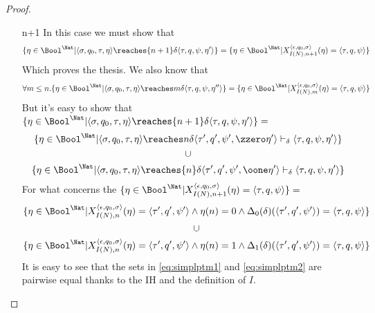 \begin{proof}
\begin{itemize}
\item[n+1] In this case we must show that
\[
\{\eta \in \Bool^\Nat| \langle \sigma, q_0, \tau, \eta\rangle  \reaches {n+1}\delta \langle \tau, q, \psi, \eta'\rangle \} = \{\eta \in \Bool^\Nat| X_{I(N), n+1}^{\langle \epsilon, q_0, \sigma\rangle} (\eta)= {\langle \tau, q, \psi\rangle}\}
\]
Which proves the thesis. We also know that
\[
\forall m\le n.\{\eta \in \Bool^\Nat| \langle \sigma, q_0, \tau, \eta\rangle  \reaches m \delta \langle \tau, q, \psi, \eta''\rangle \} = \{\eta \in \Bool^\Nat| X_{I(N), m}^{\langle \epsilon, q_0, \sigma\rangle} (\eta)= {\langle \tau, q, \psi\rangle}\}
\]
But it's easy to show that $\{\eta \in \Bool^\Nat| \langle \sigma, q_0, \tau, \eta\rangle  \reaches {n+1}\delta \langle \tau, q, \psi, \eta'\rangle \} =$
\begin{equation}
\label{eq:simplptm1}
\begin{gathered}
\{\eta \in \Bool^\Nat| \langle \sigma, q_0, \tau, \eta\rangle  \reaches n\delta \langle \tau', q', \psi', \zzero\eta'\rangle \vdash_\delta  \langle \tau, q, \psi, \eta'\rangle\}\\
\cup\\
\{\eta \in \Bool^\Nat| \langle \sigma, q_0, \tau, \eta\rangle  \reaches {n} \delta \langle \tau', q', \psi', \oone\eta'\rangle \vdash_\delta  \langle \tau, q, \psi, \eta'\rangle\}\\
\end{gathered}
\end{equation}
For what concerns the $\{\eta \in \Bool^\Nat| X_{I(N), n+1}^{\langle \epsilon, q_0, \sigma\rangle} (\eta)= {\langle \tau, q, \psi\rangle}\} =$
\begin{equation}
\label {eq:simplptm2}
\begin{gathered}
\{\eta \in \Bool^\Nat| X_{I(N), n}^{\langle \epsilon, q_0, \sigma\rangle} (\eta)= {\langle \tau', q', \psi' \rangle}\land \eta(n)=0 \land \Delta_0(\delta)(\langle \tau', q', \psi' \rangle)=\langle \tau, q, \psi\rangle\}\\
\cup\\
\{\eta \in \Bool^\Nat| X_{I(N), n}^{\langle \epsilon, q_0, \sigma\rangle} (\eta)= {\langle \tau', q', \psi' \rangle}\land \eta(n)=1 \land \Delta_1(\delta)(\langle \tau', q', \psi' \rangle)=\langle \tau, q, \psi\rangle\}
\end{gathered}
\end{equation}
It is easy to see that the sets in \eqref{eq:simplptm1} and \ref{eq:simplptm2} are pairwise equal thanks to the IH and the definition of $I$.


\end{itemize}
\end{proof}
